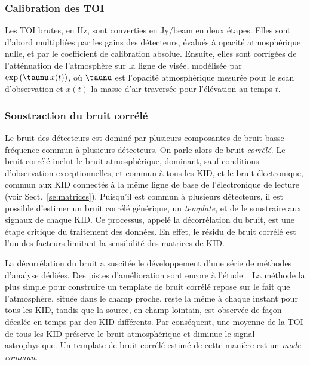 \subsubsection{Calibration des TOI} Les TOI brutes, en Hz, sont converties en
Jy/beam en deux étapes. Elles sont d'abord multipliées par les gains
des détecteurs, évalués à opacité atmosphérique nulle, et par le
coefficient de calibration absolue. Ensuite, elles sont corrigées de
l'atténuation de l'atmosphère sur la ligne de visée, modélisée par
$\exp{\left( \taunu \, x(t)\right)}$, où $\taunu$ est l'opacité atmosphérique
mesurée pour le scan d'observation et $x(t)$ la masse d'air
traversée pour l'élévation au temps $t$.

\subsubsection{Soustraction du bruit corrélé}
Le bruit des détecteurs est dominé par plusieurs composantes de bruit
basse-fréquence commun à plusieurs détecteurs. On parle alors de bruit
\emph{corrélé}. Le bruit corrélé inclut le bruit atmosphérique,
dominant, sauf conditions d'observation exceptionnelles, et commun à
tous les KID, et le bruit électronique, commun aux KID connectés à la
même ligne de base de l'électronique de lecture (voir
Sect.~\ref{se:matrices}). Puisqu'il est commun à plusieurs détecteurs,
il est possible d'estimer un bruit corrélé générique, un
\emph{template}, et de le soustraire aux signaux de chaque KID. Ce
processus, appelé la décorrélation du bruit, est une étape critique du
traitement des données. En effet, le résidu de bruit corrélé est l'un
des facteurs limitant la sensibilité des matrices de KID.

La décorrélation du bruit a suscitée le développement d'une série de
méthodes d'analyse dédiées. Des pistes d'amélioration sont encore à
l'étude~\citep{Ponthieu2020}. La méthode la plus simple pour construire
un template de bruit corrélé repose sur le fait que l'atmosphère,
située dans le champ proche, reste la même à chaque instant pour tous
les KID, tandis que la source, en champ lointain, est observée de
façon décalée en temps par des KID différents. Par conséquent, une
moyenne de la TOI de tous les KID préserve le bruit atmosphérique et
diminue le signal astrophysique. Un template de bruit corrélé estimé
de cette manière est un \emph{mode commun}.

